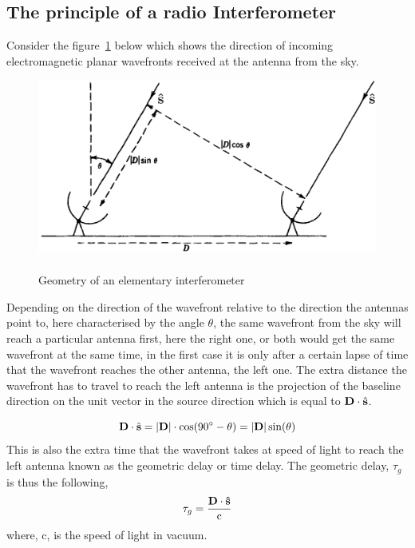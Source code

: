 \subsection{The principle of a radio Interferometer}
\label{sec:intPrincipia}
Consider the figure~\ref{fig:RadioSet} below which shows the direction of incoming electromagnetic planar wavefronts received at the antenna from the sky.
\begin{figure}[htbp]
\center
    \includegraphics[scale= 0.9]{Figures/RadioSet}
 	\caption[An elementary interferometer]{\\Geometry of an elementary interferometer}
	\label{fig:RadioSet}
\end{figure}
Depending on the direction of the wavefront relative to the direction the antennas point to, here characterised by the angle $\theta$, the same wavefront from the sky will reach a particular antenna first, here the right one, or both would get the same wavefront at the same time, in the first case it is only after a certain lapse of time that the wavefront reaches the other antenna, the left one. The extra distance the wavefront has to travel to reach the left antenna is the projection of the baseline direction on the unit vector in the source direction which is equal to ${\bf D}\cdot \hat{\bf s}$.

\begin{equation}
{\bf D}\cdot\hat{\bf s} = |{\bf D}|\cdot\cos(90^{\circ} - \theta)= |{\bf D}|\sin(\theta)
\end{equation}
This is also the extra time that the wavefront takes at speed of light to reach the left antenna known as the geometric delay or time delay. The geometric delay, $\tau_{g}$ is thus the following,
\begin{equation}
\tau_{g}=  \frac{{\bf D}\cdot {\bf \hat{s}}}{\textrm{c}}     
\end{equation}
where, c, is the speed of light in vacuum.

